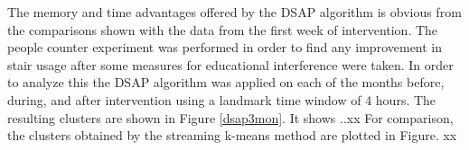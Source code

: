 \documentclass[../UNBThesis2.tex]{subfiles}
\begin{document}




The memory and time advantages offered by the DSAP algorithm is obvious from the comparisons shown with the data from the first week of intervention. The people counter experiment was performed in order to find any improvement in stair usage after some measures for educational interference were taken. In order to analyze this the DSAP algorithm was applied on each of the months before, during, and after intervention using a landmark time window of 4 hours. The resulting clusters are shown in Figure \ref{dsap3mon}. It shows ..xx
For comparison, the clusters obtained by the streaming k-means method are plotted in Figure. xx
\end{document}
